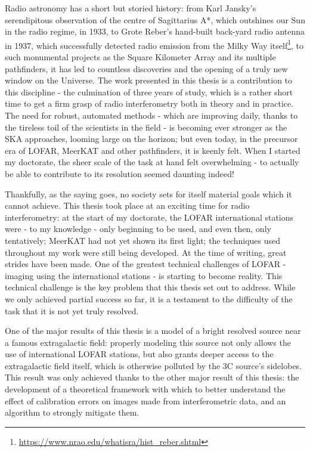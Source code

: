 \pg
Radio astronomy has a short but storied history: from Karl Jansky's serendipitous observation of the centre of Sagittarius A*, which outshines our Sun in the radio regime, in 1933, to Grote Reber's hand-built back-yard radio antenna in 1937, which successfully detected radio emission from the Milky Way itself\footnote{\url{https://www.nrao.edu/whatisra/hist_reber.shtml}}, to such monumental projects as the Square Kilometer Array and its multiple pathfinders, it has led to countless discoveries and the opening of a truly new window on the Universe. The work presented in this thesis is a contribution to this discipline - the culmination of three years of study, which is a rather short time to get a firm grasp of radio interferometry both in theory and in practice. The need for robust, automated methods - which are improving daily, thanks to the tireless toil of the scientists in the field - is becoming ever stronger as the SKA approaches, looming large on the horizon; but even today, in the precursor era of LOFAR, MeerKAT and other pathfinders, it is keenly felt. When I started my doctorate, the sheer scale of the task at hand felt overwhelming - to actually be able to contribute to its resolution seemed daunting indeed!

\pg
Thankfully, as the saying goes, no society sets for itself material goals which it cannot achieve. This thesis took place at an exciting time for radio interferometry: at the start of my doctorate, the LOFAR international stations were - to my knowledge - only beginning to be used, and even then, only tentatively; MeerKAT had not yet shown its first light; the techniques used throughout my work were still being developed. At the time of writing, great strides have been made. One of the greatest technical challenges of LOFAR - imaging using the international stations - is starting to become reality. This technical challenge is the key problem that this thesis set out to address. While we only achieved partial success so far, it is a testament to the difficulty of the task that it is not yet truly resolved.

\pg
One of the major results of this thesis is a model of a bright resolved source near a famous extragalactic field: properly modeling this source not only allows the use of international LOFAR stations, but also grants deeper access to the extragalactic field itself, which is otherwise polluted by the 3C source's sidelobes. This result was only achieved thanks to the other major result of this thesis: the development of a theoretical framework with which to better understand the effect of calibration errors on images made from interferometric data, and an algorithm to strongly mitigate them. 

